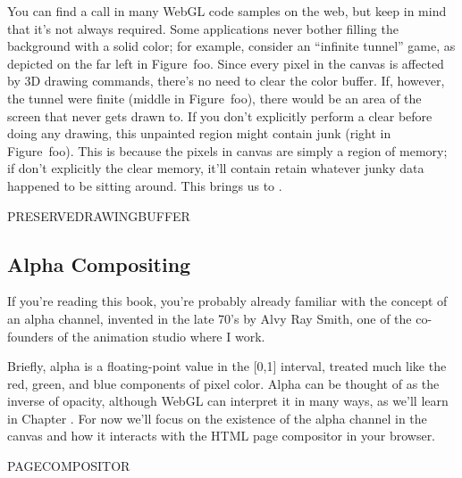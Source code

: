 {You can find a  call in many WebGL code samples on the web, but keep in mind that it's not always required.  Some applications never bother filling the background with a solid color; for example, consider an ``infinite tunnel'' game, as depicted on the far left in Figure~foo.  Since every pixel in the canvas is affected by 3D drawing commands, there's no need to clear the color buffer.  If, however, the tunnel were finite (middle in Figure~foo), there would be an area of the screen that never gets drawn to.  If you don't explicitly perform a clear before doing any drawing, this unpainted region might contain junk (right in Figure~foo).  This is because the pixels in canvas are simply a region of memory; if don't explicitly the clear memory, it'll contain retain whatever junky data happened to be sitting around.  This brings us to .

PRESERVEDRAWINGBUFFER

\subsection{Alpha Compositing}

If you're reading this book, you're probably already familiar with the concept of an alpha channel, invented in the late 70's by Alvy Ray Smith, one of the co-founders of the animation studio where I work.

Briefly, alpha is a floating-point value in the [0,1] interval, treated much like the red, green, and blue components of pixel color.  Alpha can be thought of as the inverse of opacity, although WebGL can interpret it in many ways, as we'll learn in Chapter .  For now we'll focus on the existence of the alpha channel in the canvas and how it interacts with the HTML page compositor in your browser.

PAGECOMPOSITOR

\begin{comment}
images of a web page that has a background image (Egypt!)
each canvas should have an opaque perspective cube

0,0.25,.5,.5 -- no alpha, css-opacity=1
0,0.25,.5,.5 -- alpha without premultiplied, css-opacity=1
0,0.25,.5,.5 -- alpha with premultiplied, css-opacity=1

0,0.25,.5,.5 -- no alpha, css-opacity=.5
0,0.25,.5,.5 -- alpha without premultiplied, css-opacity=.5
0,0.25,.5,.5 -- alpha with premultiplied, css-opacity=.5
\end{comment}

}
